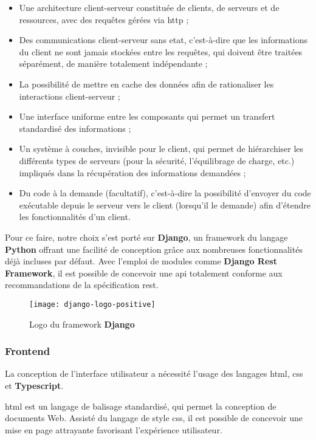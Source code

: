 \begin{itemize}
  \item Une architecture client-serveur constituée de clients, de serveurs et de ressources, avec des requêtes gérées via \acrshort{http} ;
  \item Des communications client-serveur sans etat, c'est-à-dire que les informations du client ne sont jamais stockées entre les requêtes, 
  qui doivent être traitées séparément, de manière totalement indépendante ;
  \item La possibilité de mettre en cache des données afin de rationaliser les interactions client-serveur ;
  \item Une interface uniforme entre les composants qui permet un transfert standardisé des informations ;
  \item Un système à couches, invisible pour le client, qui permet de hiérarchiser les différents types de serveurs 
  (pour la sécurité, l'équilibrage de charge, etc.) impliqués dans la récupération des informations demandées ;
  \item Du code à la demande (facultatif), c'est-à-dire la possibilité d'envoyer du code exécutable depuis le serveur vers le client 
  (lorsqu'il le demande) afin d'étendre les fonctionnalités d'un client.\cite{redhat_rest_spec}
\end{itemize}

Pour ce faire, notre choix s’est porté sur \textbf{Django}, un framework du langage \textbf{Python} offrant une facilité de conception grâce aux nombreuses fonctionnalités déjà incluses par défaut. 
Avec l’emploi de modules comme \textbf{Django Rest Framework}, il est possible de concevoir une \acrshort{api} totalement conforme aux recommandations de la spécification \acrshort{rest}.

\begin{figure}[H]
  \centering
  \texttt{[image: django-logo-positive]}
  \caption{Logo du framework \textbf{Django}}
  \label{fig:django_logo}
\end{figure}


\subsubsection{Frontend}
La conception de l’interface utilisateur a nécessité l’usage des langages \acrshort{html}, \acrshort{css} et \textbf{Typescript}.

\acrshort{html} est un langage de balisage standardisé, qui permet la conception de documents Web. 
Assisté du langage de style \acrshort{css}, il est possible de concevoir une mise en page attrayante favorisant l'expérience utilisateur.

